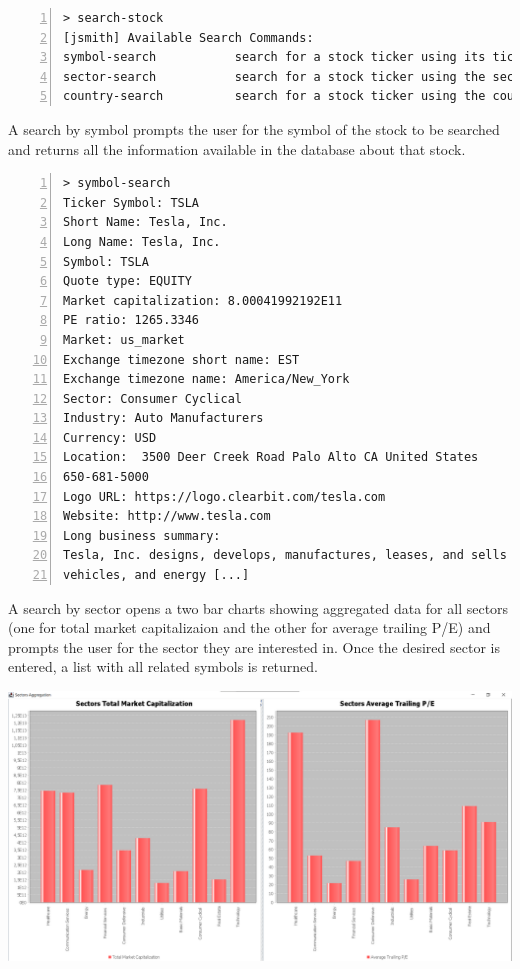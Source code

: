 \begin{lstlisting}[basicstyle=\footnotesize\ttfamily,language={},numbers=left,keepspaces=true,tabsize=4,
numberstyle=\footnotesize,numbersep=8pt,frame=single]
> search-stock
[jsmith] Available Search Commands:
symbol-search			search for a stock ticker using its ticker.
sector-search			search for a stock ticker using the sector.
country-search			search for a stock ticker using the country.
\end{lstlisting}
A search by symbol prompts the user for the symbol of the stock to be searched and returns all the information available in the database about that stock.
\begin{lstlisting}[basicstyle=\footnotesize\ttfamily,language={},numbers=left,keepspaces=true,tabsize=4,
numberstyle=\footnotesize,numbersep=8pt,frame=single]
> symbol-search
Ticker Symbol: TSLA
Short Name: Tesla, Inc.
Long Name: Tesla, Inc.
Symbol: TSLA
Quote type: EQUITY
Market capitalization: 8.00041992192E11
PE ratio: 1265.3346
Market: us_market
Exchange timezone short name: EST
Exchange timezone name: America/New_York
Sector: Consumer Cyclical
Industry: Auto Manufacturers
Currency: USD
Location:  3500 Deer Creek Road Palo Alto CA United States
650-681-5000
Logo URL: https://logo.clearbit.com/tesla.com
Website: http://www.tesla.com
Long business summary:
Tesla, Inc. designs, develops, manufactures, leases, and sells electric
vehicles, and energy [...]

\end{lstlisting}

A search by sector opens a two bar charts showing aggregated data for all sectors (one for total market capitalizaion and the other for average trailing P/E) and prompts the user for the sector they are interested in.
Once the desired sector is entered, a list with all related symbols is returned.

\hfill \break
{\centering
\includegraphics[scale=0.28]{img/user_manual/sector_aggregation.png}\\
}

